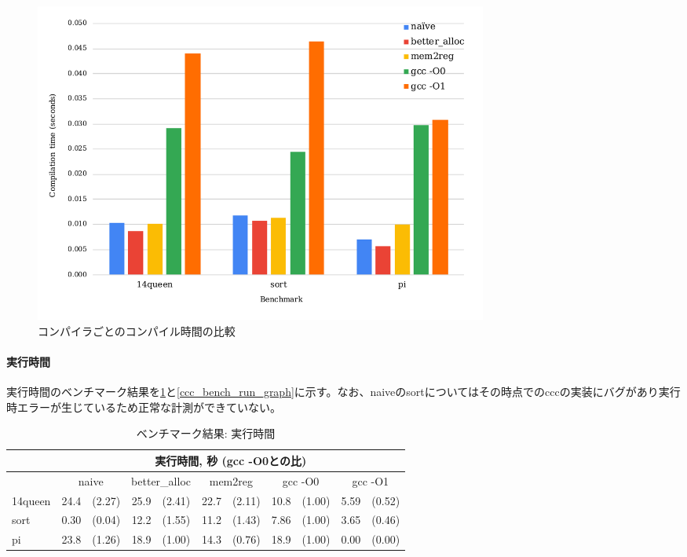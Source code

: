 \documentclass[uplatex,a4paper]{jsarticle}
\begin{document}
\begin{figure}[h]
  \centering
  \includegraphics[width=15cm]{graph2.pdf}
  \caption{コンパイラごとのコンパイル時間の比較}
  \label{ccc_bench_compile_graph}
\end{figure}

\clearpage
\paragraph{実行時間}

実行時間のベンチマーク結果を\cref{ccc_bench_run}と\cref{ccc_bench_run_graph}に示す。なお、naiveのsortについてはその時点でのcccの実装にバグがあり実行時エラーが生じているため正常な計測ができていない。

\begin{table}[h]
  \centering
  \begin{tabular}{l|rl|rl|rl|rl|rl}
    &\multicolumn{10}{c}{実行時間, 秒 (gcc -O0との比)} \\ \hline
    &\multicolumn{2}{c|}{naive}&\multicolumn{2}{c|}{better\_alloc}&\multicolumn{2}{c|}{mem2reg}&\multicolumn{2}{c|}{gcc -O0}&\multicolumn{2}{c}{gcc -O1} \\ \hline\hline
    14queen&24.4&(2.27)&25.9&(2.41)&22.7&(2.11)&10.8&(1.00)&5.59&(0.52) \\
    sort&0.30&(0.04)&12.2&(1.55)&11.2&(1.43)&7.86&(1.00)&3.65&(0.46) \\
    pi&23.8&(1.26)&18.9&(1.00)&14.3&(0.76)&18.9&(1.00)&0.00&(0.00) \\
  \end{tabular}
  \caption{ベンチマーク結果: 実行時間}
  \label{ccc_bench_run}
\end{table}
\end{document}
